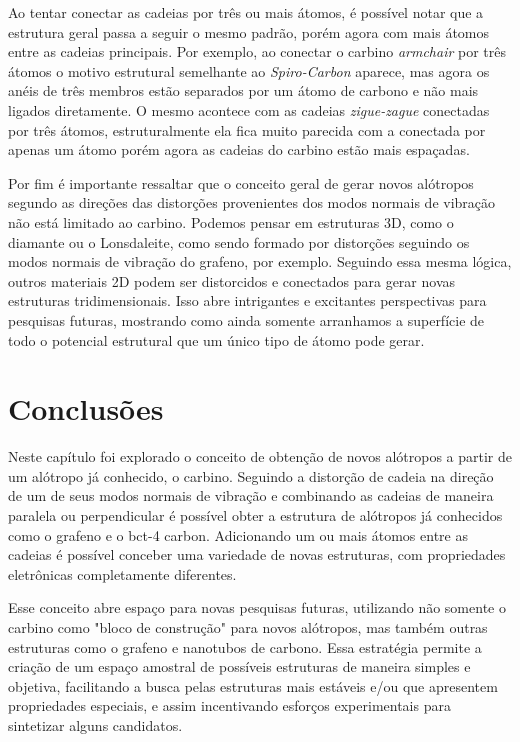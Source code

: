 		Ao tentar conectar as cadeias por três ou mais átomos, é possível notar que a estrutura geral passa a seguir o mesmo padrão, porém agora com mais átomos entre as cadeias principais. Por exemplo, ao conectar o carbino \textit{armchair} por três átomos o motivo estrutural semelhante ao \textit{Spiro-Carbon} aparece, mas agora os anéis de três membros estão separados por um átomo de carbono e não mais ligados diretamente. O mesmo acontece com as cadeias \textit{zigue-zague} conectadas por três átomos, estruturalmente ela fica muito parecida com a conectada por apenas um átomo porém agora as cadeias do carbino estão mais espaçadas. 
		
		Por fim é importante ressaltar que o conceito geral de gerar novos alótropos segundo as direções das distorções provenientes dos modos normais de vibração não está limitado ao carbino. Podemos pensar em estruturas 3D, como o diamante ou o Lonsdaleite, como sendo formado por distorções seguindo os modos normais de vibração do grafeno, por exemplo. Seguindo essa mesma lógica, outros materiais 2D podem ser distorcidos e conectados para gerar novas estruturas tridimensionais. Isso abre intrigantes e excitantes perspectivas para pesquisas futuras, mostrando como ainda somente arranhamos a superfície de todo o potencial estrutural que um único tipo de átomo pode gerar. 
	
		
	\section{Conclusões}
		
		Neste capítulo foi explorado o conceito de obtenção de novos alótropos a partir de um alótropo já conhecido, o carbino. Seguindo a distorção de cadeia na direção de um de seus modos normais de vibração e combinando as cadeias de maneira paralela ou perpendicular é possível obter a estrutura de alótropos já conhecidos como o grafeno e o bct-4 carbon. Adicionando um ou mais átomos entre as cadeias é possível conceber uma variedade de novas estruturas, com propriedades eletrônicas completamente diferentes. 
		
		Esse conceito abre espaço para novas pesquisas futuras, utilizando não somente o carbino como "bloco de construção" para novos alótropos, mas também outras estruturas como o grafeno e nanotubos de carbono. Essa estratégia permite a criação de um espaço amostral de possíveis estruturas de maneira simples e objetiva, facilitando a busca pelas estruturas mais estáveis e/ou que apresentem propriedades especiais, e assim incentivando esforços experimentais para sintetizar alguns candidatos. 